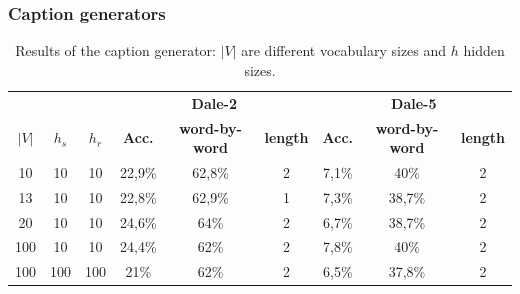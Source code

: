 \subsubsection{Caption generators}
\begin{table}[h]
    \centering
    \begin{tabular}{ccc|ccc|ccc}
        \toprule
              &         &         & \multicolumn{3}{c}{\textbf{Dale-2}} & \multicolumn{3}{c}{\textbf{Dale-5}}                                                                             \\\cmidrule(lr){4-6}\cmidrule(lr){7-9}
        $|V|$ & $h_{s}$ & $h_{r}$ & \textbf{Acc.}                       & \textbf{word-by-word}               & \textbf{length} & \textbf{Acc.} & \textbf{word-by-word} & \textbf{length} \\\midrule
        {10}  & {10}    & {10}    & {22,9\%}                            & {62,8\%}                            & {2}             & {7,1\%}       & {40\%}                & {2}             \\
        {13}  & {10}    & {10}    & {22,8\%}                            & {62,9\%}                            & {1}             & {7,3\%}       & {38,7\%}              & {2}             \\
        {20}  & {10}    & {10}    & {24,6\%}                            & {64\%}                              & {2}             & {6,7\%}       & {38,7\%}              & {2}             \\
        {100} & {10}    & {10}    & {24,4\%}                            & {62\%}                              & {2}             & {7,8\%}       & {40\%}                & {2}             \\
        {100} & {100}   & {100}   & {21\%}                              & {62\%}                              & {2}             & {6,5\%}       & {37,8\%}              & {2}             \\
        \bottomrule
    \end{tabular}
    \caption{Results of the caption generator: $|V|$ are different vocabulary sizes and $h$ hidden sizes.}
    \label{tab:results_caption_generator_game}
\end{table}

